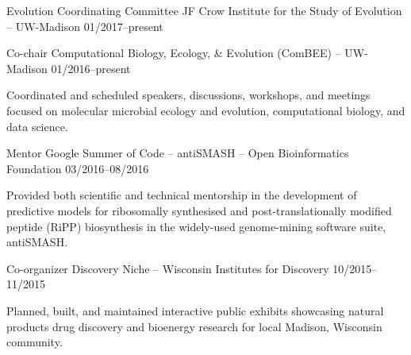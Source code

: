 \newpage


\begin{cventries}

  \cventry
    {Evolution Coordinating Committee} %
    {JF Crow Institute for the Study of Evolution -- UW-Madison} %
    {} %
    {01/2017--present} %
    {
    }

  \cventry
    {Co-chair} %
    {Computational Biology, Ecology, \& Evolution (ComBEE) -- UW-Madison} %
    {} %
    {01/2016--present} %
    {
      \begin{cvitems} %
        \item {Coordinated and scheduled speakers, discussions, workshops, and meetings focused on molecular microbial ecology and evolution, computational biology, and data science.}
      \end{cvitems}
    }

  \cventry
    {Mentor} %
    {Google Summer of Code -- antiSMASH -- Open Bioinformatics Foundation} %
    {} %
    {03/2016--08/2016} %
    {
      \begin{cvitems} %
        \item {Provided both scientific and technical mentorship in the development of predictive models for ribosomally synthesised and post-translationally modified peptide (RiPP) biosynthesis in the widely-used genome-mining software suite, antiSMASH.}
      \end{cvitems}
    }
    
  \cventry
    {Co-organizer} %
    {Discovery Niche -- Wisconsin Institutes for Discovery} %
    {} %
    {10/2015--11/2015} %
    {
      \begin{cvitems} %
        \item {Planned, built, and maintained interactive public exhibits showcasing natural products drug discovery and bioenergy research for local Madison, Wisconsin community.}
      \end{cvitems}
    }
    

\end{cventries}
